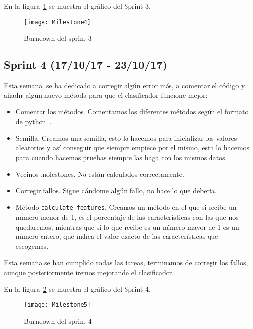 En la figura~\ref{fig:Milestone4} se muestra el gráfico del Sprint 3.

\begin{figure}
\centering
\texttt{[image: Milestone4]}
\caption{Burndown del sprint 3}
\label{fig:Milestone4}
\end{figure}

\subsection{Sprint 4 (17/10/17 - 23/10/17)}
Esta semana, se ha dedicado a corregir algún error más, a comentar el código y añadir algún nuevo método para que el clasificador funcione mejor:
\begin{itemize}
\item Comentar los métodos. Comentamos los diferentes métodos según el formato de python~\cite{comment}.
\item Semilla. Creamos una semilla, esto lo hacemos para inicializar los valores aleatorios y así conseguir que siempre empiece por el mismo, esto lo hacemos para cuando hacemos pruebas siempre las haga con los mismos datos.
\item Vecinos molestones. No están calculados correctamente.
\item Corregir fallos. Sigue dándome algún fallo, no hace lo que debería.
\item Método \texttt{calculate\_features}. Creamos un método en el que si recibe un numero menor de 1, es el porcentaje de las características con las que nos quedaremos, mientras que si lo que recibe es un número mayor de 1 es un número entero, que índica el valor exacto de las características que escogemos.
\end{itemize}

Esta semana se han cumplido todas las tareas, terminamos de corregir los fallos, aunque posteriormente iremos mejorando el clasificador.

En la figura~\ref{fig:Milestone5} se muestra el gráfico del Sprint 4.

\begin{figure}
\centering
\texttt{[image: Milestone5]}
\caption{Burndown del sprint 4}
\label{fig:Milestone5}
\end{figure}

